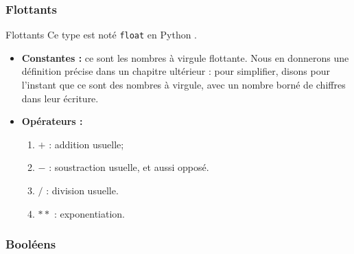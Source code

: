 \subsubsection{Flottants}
\begin{defi}{Flottants}
Ce type est noté \texttt{float} en Python .
\begin{itemize}
\item  \textbf{Constantes :} ce sont les {nombres à virgule flottante}. Nous en
donnerons une définition précise dans un chapitre ultérieur : pour simplifier, disons pour 
l'instant que ce sont des nombres à virgule, avec un nombre borné de chiffres dans leur écriture.
\item \textbf{Opérateurs : }
\begin{enumerate}
 \item $+$ : addition usuelle;
 \item $-$ : soustraction usuelle, et aussi opposé.
\item  $/$ : division usuelle.
\item $**$ : exponentiation. %
\end{enumerate}
\end{itemize}
\end{defi}

\subsubsection{Booléens}


